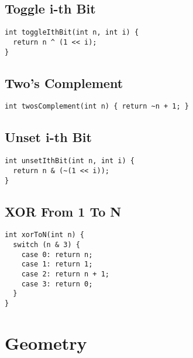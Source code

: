 \documentclass[twoside]{article}
\newcommand{\fileTitleStyle}{\large\underline}
\begin{document}
\begin{multicols*}{2}
\subsectionfont{\centering\bfseries\LARGE}
\subsectionfont{\fileTitleStyle}
\subsection*{Toggle i-th Bit}
\begin{verbatim}
int toggleIthBit(int n, int i) {
  return n ^ (1 << i);
}
\end{verbatim}

\subsectionfont{\centering\bfseries\LARGE}
\subsectionfont{\fileTitleStyle}
\subsection*{Two's Complement}
\begin{verbatim}
int twosComplement(int n) { return ~n + 1; }
\end{verbatim}

\subsectionfont{\centering\bfseries\LARGE}
\subsectionfont{\fileTitleStyle}
\subsection*{Unset i-th Bit}
\begin{verbatim}
int unsetIthBit(int n, int i) {
  return n & (~(1 << i));
}
\end{verbatim}

\subsectionfont{\centering\bfseries\LARGE}
\subsectionfont{\fileTitleStyle}
\subsection*{XOR From 1 To N}
\begin{verbatim}
int xorToN(int n) {
  switch (n & 3) {
    case 0: return n;
    case 1: return 1;
    case 2: return n + 1;
    case 3: return 0;
  }
}
\end{verbatim}

\sectionfont{\centering\bfseries\Huge}
\vspace{1em}
\section*{Geometry}
\vspace{3em}
\subsectionfont{\centering\bfseries\LARGE}
\vspace{0em}

\end{multicols*}
\end{document}
